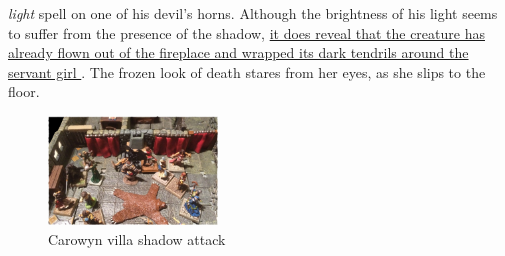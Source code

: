 {\itshape light} spell on one of his devil's horns. Although the brightness of his light seems to suffer from the presence of the shadow, \hyperref[fig:Carowyn-villa-shadow-attack-486296086]{ it does reveal that the creature has already flown out of the fireplace and wrapped its dark tendrils around the servant girl } . The frozen look of death stares from her eyes, as she slips to the floor. \\

\begin{figure}[h]
	\centering
	\includegraphics[width=0.4\textwidth]{images/Carowyn-villa-shadow-attack-486296086_mod.jpg}
	\caption{Carowyn villa shadow attack}
	\label{fig:Carowyn-villa-shadow-attack-486296086}
\end{figure}

